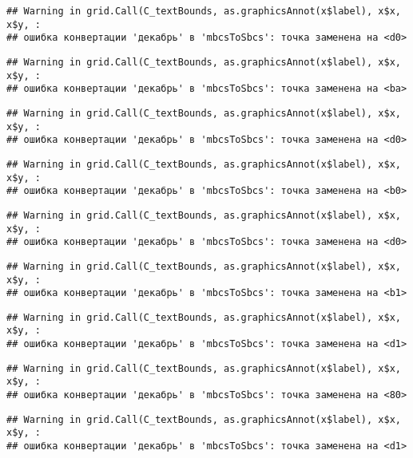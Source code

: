 \documentclass[
]{article}
\begin{document}
\begin{verbatim}
## Warning in grid.Call(C_textBounds, as.graphicsAnnot(x$label), x$x, x$y, :
## ошибка конвертации 'декабрь' в 'mbcsToSbcs': точка заменена на <d0>
\end{verbatim}

\begin{verbatim}
## Warning in grid.Call(C_textBounds, as.graphicsAnnot(x$label), x$x, x$y, :
## ошибка конвертации 'декабрь' в 'mbcsToSbcs': точка заменена на <ba>
\end{verbatim}

\begin{verbatim}
## Warning in grid.Call(C_textBounds, as.graphicsAnnot(x$label), x$x, x$y, :
## ошибка конвертации 'декабрь' в 'mbcsToSbcs': точка заменена на <d0>
\end{verbatim}

\begin{verbatim}
## Warning in grid.Call(C_textBounds, as.graphicsAnnot(x$label), x$x, x$y, :
## ошибка конвертации 'декабрь' в 'mbcsToSbcs': точка заменена на <b0>
\end{verbatim}

\begin{verbatim}
## Warning in grid.Call(C_textBounds, as.graphicsAnnot(x$label), x$x, x$y, :
## ошибка конвертации 'декабрь' в 'mbcsToSbcs': точка заменена на <d0>
\end{verbatim}

\begin{verbatim}
## Warning in grid.Call(C_textBounds, as.graphicsAnnot(x$label), x$x, x$y, :
## ошибка конвертации 'декабрь' в 'mbcsToSbcs': точка заменена на <b1>
\end{verbatim}

\begin{verbatim}
## Warning in grid.Call(C_textBounds, as.graphicsAnnot(x$label), x$x, x$y, :
## ошибка конвертации 'декабрь' в 'mbcsToSbcs': точка заменена на <d1>
\end{verbatim}

\begin{verbatim}
## Warning in grid.Call(C_textBounds, as.graphicsAnnot(x$label), x$x, x$y, :
## ошибка конвертации 'декабрь' в 'mbcsToSbcs': точка заменена на <80>
\end{verbatim}

\begin{verbatim}
## Warning in grid.Call(C_textBounds, as.graphicsAnnot(x$label), x$x, x$y, :
## ошибка конвертации 'декабрь' в 'mbcsToSbcs': точка заменена на <d1>
\end{verbatim}
\end{document}
